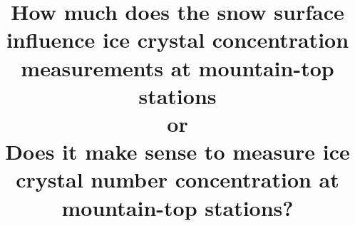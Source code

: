 \documentclass[draft,linenumbers]{agujournal}
\begin{document}
% 
%


\title{How much does the snow surface influence ice crystal concentration measurements at mountain-top stations \\ or \\ Does it make sense to measure ice crystal number concentration at mountain-top stations?}

%
%









\end{document}
